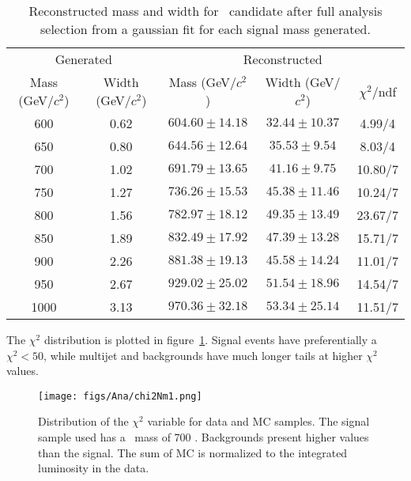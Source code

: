 \begin{table*}[htbH]
\begin{center}
\begin{tabular}{|c|c|c|c|c|}
\hline 
\multicolumn{2}{|c}{Generated} & \multicolumn{3}{|c|}{Reconstructed} \\
Mass (GeV/$c^{2}$) & Width (GeV/$c^{2}$) & Mass (GeV/$c^{2}$) & Width (GeV/$c^{2}$) & $\chi^{2} /$ndf\\
\hline
600 & 0.62 &$604.60\pm14.18$ & $32.44\pm10.37$ & 4.99/4\\
650 & 0.80 &$644.56\pm12.64$ & $35.53\pm9.54$ & 8.03/4\\
700 & 1.02 &$691.79\pm13.65$ & $41.16\pm9.75$ & 10.80/7\\
750 & 1.27 &$736.26\pm15.53$ & $45.38\pm11.46$ & 10.24/7\\
800 & 1.56 &$782.97\pm18.12$ & $49.35\pm13.49$ & 23.67/7\\
850 & 1.89 &$832.49\pm17.92$ & $47.39\pm13.28$ & 15.71/7\\
900 & 2.26 &$881.38\pm19.13$ & $45.58\pm14.24$ & 11.01/7\\
950 & 2.67 &$929.02\pm25.02$ & $51.54\pm18.96$ & 14.54/7\\
1000 & 3.13 &$970.36\pm32.18$ & $53.34\pm25.14$ & 11.51/7\\
\hline
\end{tabular}
\caption{Reconstructed mass and width for \Tp~candidate after full analysis selection from a gaussian fit for each signal mass generated. \label{tab:SignalWidths}}
\end{center}
\end{table*}

The $\chi^{2}$ distribution is plotted in figure~\ref{fig:chi2}. Signal events have preferentially a $\chi^{2}<50$, while multijet and \ttbar backgrounds have much longer tails at higher $\chi^{2}$ values.

\begin{figure}[!Hhtbp]
  \begin{center}
    \texttt{[image: figs/Ana/chi2Nm1.png]}
    \caption{Distribution of the $\chi^{2}$ variable for data and MC samples. The signal sample used has a \Tp~mass of 700 \GeVcc. Backgrounds present higher values than the signal. The sum of MC is normalized to the integrated luminosity in the data.}
    \label{fig:chi2}
  \end{center}
\end{figure}

